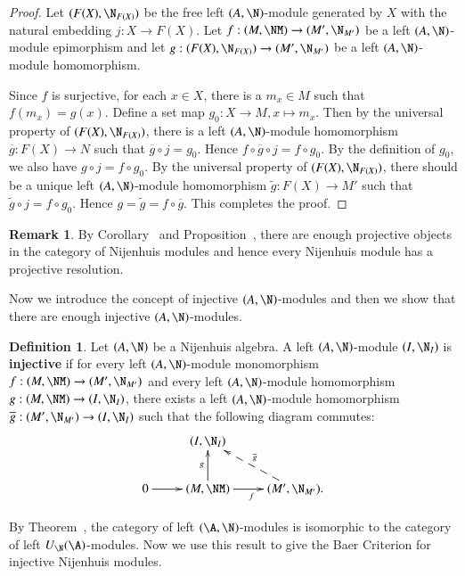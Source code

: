 \documentclass[12pt]{amsart}
\theoremstyle{definition}
\newtheorem{defn}[theorem]{Definition}
\newtheorem{remark}[theorem]{Remark}
\renewcommand\tilde[1]{\widetilde{#1}}
\begin{document}
\begin{proof}
Let $(F(X), \N_{F(X)})$ be the free left $(A,\N)$-module generated by $X$ with the natural embedding $j: X \rightarrow F(X)$. Let $f:(M,\NM)\to (M', \N_{M'})$ be a left $(A,\N)$-module epimorphism and let $g: (F(X),\N_{F(X)}) \to (M',\N_{M'})$ be a left $(A,\N)$-module homomorphism.

Since $f$ is surjective, for each $x\in X$,
there is a $m_x\in M$ such that $f(m_x) = g(x)$. Define a set map $g_0: X \to M, x \mapsto m_x$. Then by the universal property of $(F(X),\N_{F(X)})$, there is a left $(A, \N)$-module homomorphism $\overline{g}:F(X) \to N$ such that $ \overline{g}\circ j = g_0$. Hence $ f\circ \overline{g}\circ j = f\circ g_0$. By the definition of $g_0$, we also have $g \circ j=f \circ g_0$. By the universal property of $(F(X), \N_{F(X)})$, there should be a unique left $(A, \N)$-module homomorphism $\tilde{g}: F(X) \rightarrow M'$ such that $\tilde{g} \circ j=f \circ g_0$. Hence $g=\tilde{g}=f \circ \overline{g}$. This completes the proof.

\end{proof}

\begin{remark}
By Corollary~ and Proposition~, there are enough projective objects in the category of Nijenhuis modules and hence every Nijenhuis module has a projective resolution.
\end{remark}

Now we introduce the concept of injective $(A,\N)$-modules and then we show that there are enough injective $(A,\N)$-modules.

\begin{defn}
Let $(A,\N)$ be a Nijenhuis algebra. A left $(A,\N)$-module $(I,\N_I)$ is {\bf injective} if for every left $(A,\N)$-module monomorphism $f:(M,\NM) \to (M', \N_{M'})$ and every left $(A,\N)$-module homomorphism $g:(M,\NM) \to (I,\N_I)$,
there exists a left $(A,\N)$-module homomorphism $\overline{g}: (M',\N_{M'}) \to (I,\N_I)$ such that the following diagram commutes:
$$
\xymatrix{
&(I,\N_I)\ar@{<--}^{\overline{g}}[dr]&\\
0\ar[r]&(M,\NM)\ar_{f}[r]\ar^{g}[u]&(M',\N_{M'}).}
$$
\end{defn}

By Theorem~, the category of left $(\A,\N)$-modules is isomorphic to the category of left $U_{\N}(\A)$-modules. Now we use this result to give the Baer Criterion for injective Nijenhuis modules.
\end{document}
